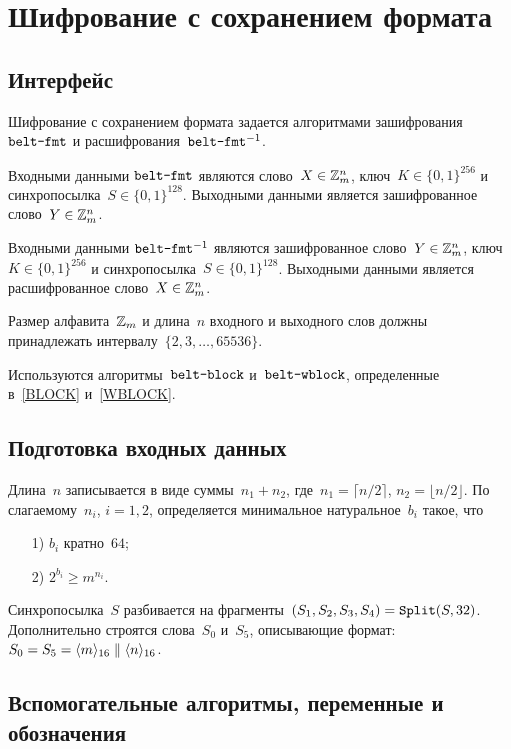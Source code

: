 \section{Шифрование с сохранением формата}\label{FMT}

\subsection{Интерфейс}\label{FMT.IFace}

Шифрование с сохранением формата задается алгоритмами зашифрования
$\texttt{belt-fmt}$ и расшифрования~$\texttt{belt-fmt}^{-1}$.

Входными данными $\texttt{belt-fmt}$ являются 
слово~$X\in\mathbb{Z}_m^n$, ключ~$K\in\{0,1\}^{256}$ 
и синхропосылка~$S\in\{0,1\}^{128}$.
%
Выходными данными является зашифрованное слово~$Y\in\mathbb{Z}_m^n$.

Входными данными $\texttt{belt-fmt}^{-1}$ являются 
зашифрованное слово~$Y\in\mathbb{Z}_m^n$, ключ~$K\in\{0,1\}^{256}$ 
и синхропосылка~$S\in\{0,1\}^{128}$.
%
Выходными данными является расшифрованное слово~$X\in\mathbb{Z}_m^n$.

Размер алфавита~$\mathbb{Z}_m$ и длина~$n$ входного и выходного слов 
должны принадлежать интервалу~$\{2,3,\ldots,65536\}$.

Используются алгоритмы~$\texttt{belt-block}$ и~$\texttt{belt-wblock}$,
определенные в~\ref{BLOCK} и~\ref{WBLOCK}.

\subsection{Подготовка входных данных}\label{FMT.Data}

Длина~$n$ записывается в виде суммы~$n_1+n_2$,
где~$n_1=\lceil n/2\rceil$, $n_2=\lfloor n/2\rfloor$.
%
По слагаемому~$n_i$, $i=1,2$, определяется минимальное натуральное~$b_i$ 
такое, что
\begin{enumerate}
\item[1)]
$b_i$ кратно~$64$;
\item[2)]
$2^{b_i}\geq m^{n_i}$.
\end{enumerate}

Синхропосылка~$S$ разбивается на фрагменты~$(S_1,S_2,S_3,S_4)=\mathop{\texttt{Split}}\nolimits(S,32)$. 
%
Дополнительно строятся слова~$S_0$ и~$S_5$, описывающие формат: 
$S_0=S_5=\langle m\rangle_{16}\parallel\langle n\rangle_{16}$. 

\subsection{Вспомогательные алгоритмы, переменные и обозначения}\label{FMT.Aux}

